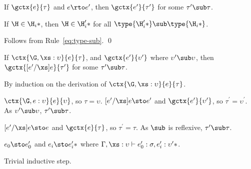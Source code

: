 \begin{theorem}[Preservation]
\label{th:preservation}

If $\gctx{e}{\tau}$ and $e \rto e^\prime$, then $\gctx{e^\prime}{\tau^\prime}$
for some $\tau^\prime \sub \tau$.

\begin{lemma}
\label{lem:submethod}

If $\H \in \*\H_i*$, then $\H \in \*\H^\prime_i*$ for all
$\type{\*\H^\prime_i*} \sub \type{\*\H_i*}$.

\begin{lproof}
Follows from Rule~\ref{eq:type-sub}. \qed
\end{lproof}

\end{lemma}

\begin{lemma}
\label{lem:preservation}

If $\ctx{\G, \xs : \upsilon}{e}{\tau}$, and $\gctx{e^\prime}{\upsilon^\prime}$
where $\upsilon^\prime \sub \upsilon$, then
$\gctx{[e^\prime/\xs]e}{\tau^\prime}$ for some $\tau^\prime \sub \tau$.

\begin{lproof}

By induction on the derivation of $\ctx{\G, \xs : \upsilon}{e}{\tau}$.

\begin{lcase}[S-Var: $e = \xs$]
$\ctx{\G, e : \upsilon}{e}{\upsilon}$, so $\tau = \upsilon$.
$[e^\prime/\xs]e \sto e^\prime$ and $\gctx{e^\prime}{\upsilon^\prime}$, so
$\tau^\prime = \upsilon^\prime$.  As
$\upsilon^\prime \sub \upsilon$, $ \tau^\prime \sub \tau$.
\end{lcase}

\begin{lcase}[S-None: $e = y~\mathbf{where}~y \neq \xs$]
$[e^\prime/\xs]e \sto e$ and $\gctx{e}{\tau}$, so
$\tau^\prime = \tau$.  As $\sub$ is reflexive, $\tau^\prime \sub \tau$.
\end{lcase}

\begin{lcase}[S-Req: $e = e_0.m(\*e_i*)$]
$e_0 \sto e^\prime_0$ and $\*e_i \sto e^\prime_i*$ where
$\Gamma, \xs : \upsilon \vdash e^\prime_0 : \sigma, \*e^\prime_i : \upsilon^\prime*$.
\end{lcase}

\begin{lcase}[S-Obj/S-Meth: $e = \object{\*\M_i*}, \xs = x$]
Trivial inductive step.
\end{lcase}


\end{lproof}
\end{lemma}
\end{theorem}
